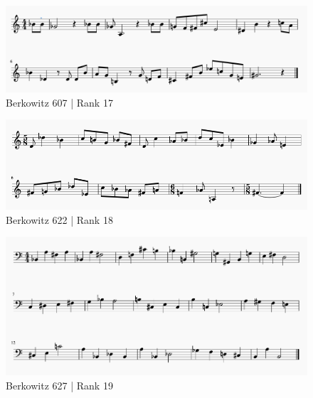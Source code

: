 \documentclass[]{book}
\begin{document}
\begin{figure}

{\centering \includegraphics[width=1\linewidth]{img/survey_melodies/Berkowitz607tx} 

}

\caption{Berkowitz 607 | Rank 17}\label{fig:berk607tx}
\end{figure}

\begin{figure}

{\centering \includegraphics[width=1\linewidth]{img/survey_melodies/Berkowitz622} 

}

\caption{Berkowitz 622 | Rank 18}\label{fig:berk622}
\end{figure}

\begin{figure}

{\centering \includegraphics[width=1\linewidth]{img/survey_melodies/Berkowitz627} 

}

\caption{Berkowitz 627 | Rank 19}\label{fig:berk627}
\end{figure}
\end{document}
